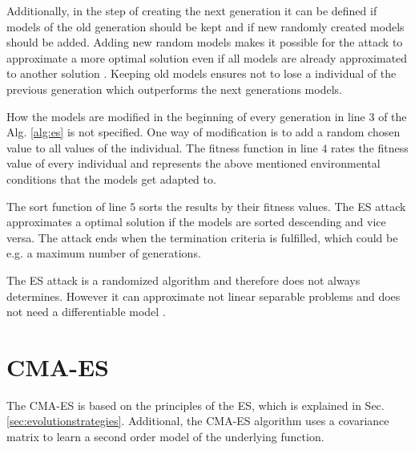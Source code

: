 Additionally, in the step of creating the next generation it can be defined if models of the old generation should be kept and if new randomly created models should be added. %
Adding new random models makes it possible for the attack to approximate a more optimal solution even if all models are already approximated to another solution \cite{Wikipedia2016EvolutionStrategy}.
Keeping old models ensures not to lose a individual of the previous generation which outperforms the next generations models.

How the models are modified in the beginning of every generation in line $3$ of the Alg. \ref{alg:es} is not specified.
One way of modification is to add a random chosen value to all values of the individual. %
The fitness function in line $4$ rates the fitness value of every individual and represents the above mentioned environmental conditions that the models get adapted to. %

The sort function of line $5$ sorts the results by their fitness values.
The \ac{ES} attack approximates a optimal solution if the models are sorted descending and vice versa. %
The attack ends when the termination criteria is fulfilled, which could be e.g. a maximum number of generations.

The \ac{ES} attack is a randomized algorithm and therefore does not always determines.
However it can approximate not linear separable problems and does not need a differentiable model \cite{Ruhrmair2010ModelingFunctions}.
	

\section{CMA-ES}
\label{sec:cma-es}

The \acf{CMA-ES} is based on the principles of the \ac{ES}, which is explained in Sec. \ref{sec:evolutionstrategies}.
Additional, the \ac{CMA-ES} algorithm uses a covariance matrix to learn a second order model of the underlying function.

